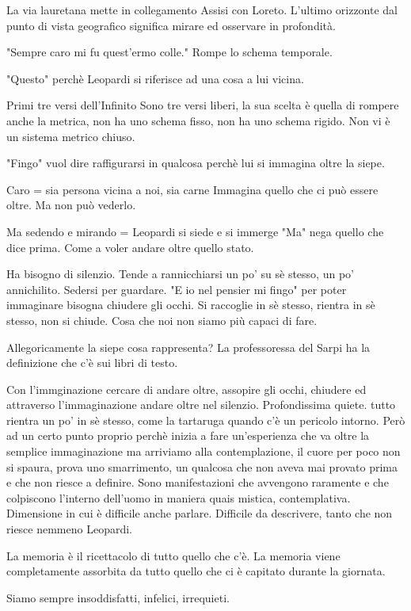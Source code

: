 \documentclass{article}
\begin{document}
    La via lauretana mette in collegamento Assisi con Loreto. L'ultimo orizzonte dal punto di vista geografico significa mirare ed osservare in profondità.

    "Sempre caro mi fu quest'ermo colle." Rompe lo schema temporale.

    "Questo" perchè Leopardi si riferisce ad una cosa a lui vicina.

    Primi tre versi dell'Infinito
    Sono tre versi liberi, la sua scelta è quella di rompere anche la metrica, non ha uno schema fisso, non ha uno schema rigido. 
    Non vi è un sistema metrico chiuso.

    "Fingo" vuol dire raffigurarsi in qualcosa perchè lui si immagina oltre la siepe.

    Caro = sia persona vicina a noi, sia carne
    Immagina quello che ci può essere oltre. Ma non può vederlo.

    Ma sedendo e mirando = Leopardi si siede e si immerge
    "Ma" nega quello che dice prima. Come a voler andare oltre quello stato.

    Ha bisogno di silenzio. Tende a rannicchiarsi un po' su sè stesso, un po' annichilito. Sedersi per guardare. "E io nel pensier mi fingo" per poter immaginare bisogna chiudere gli occhi. Si raccoglie in sè stesso, rientra in sè stesso, non si chiude. Cosa che noi non siamo più capaci di fare.

    Allegoricamente la siepe cosa rappresenta? La professoressa del Sarpi ha la definizione che c'è sui libri di testo.

    Con l'immginazione cercare di andare oltre, assopire gli occhi, chiudere ed attraverso l'immaginazione andare oltre nel silenzio. Profondissima quiete. tutto rientra un po' in sè stesso, come la tartaruga quando c'è un pericolo intorno. Però ad un certo punto proprio perchè inizia a fare un'esperienza che va oltre la semplice immaginazione ma arriviamo alla contemplazione, il cuore per poco non si spaura, prova uno smarrimento, un qualcosa che non aveva mai provato prima e che non riesce a definire. Sono manifestazioni che avvengono raramente e che colpiscono l'interno dell'uomo in maniera quais mistica, contemplativa. Dimensione in cui è difficile anche parlare.
    Difficile da descrivere, tanto che non riesce nemmeno Leopardi.

    La memoria è il ricettacolo di tutto quello che c'è. La memoria viene completamente assorbita da tutto quello che ci è capitato durante la giornata.

    Siamo sempre insoddisfatti, infelici, irrequieti.
\end{document}
